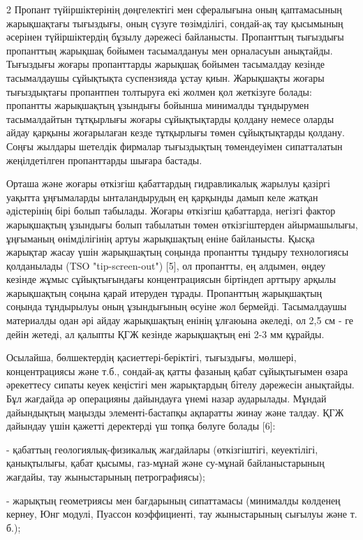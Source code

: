 \begin{multicols}{2}
Пропант түйіршіктерінің дөңгелектігі мен сфералығына оның қаптамасының
жарықшақтағы тығыздығы, оның сүзуге төзімділігі, сондай-ақ тау қысымының
әсерінен түйіршіктердің бұзылу дәрежесі байланысты. Пропанттың тығыздығы
пропанттың жарықшақ бойымен тасымалдануы мен орналасуын анықтайды.
Тығыздығы жоғары пропанттарды жарықшақ бойымен тасымалдау кезінде
тасымалдаушы сұйықтықта суспензияда ұстау қиын. Жарықшақты жоғары
тығыздықтағы пропантпен толтыруға екі жолмен қол жеткізуге болады:
пропантты жарықшақтың ұзындығы бойынша минималды тұндырумен
тасымалдайтын тұтқырлығы жоғары сұйықтықтарды қолдану немесе оларды
айдау қарқыны жоғарылаған кезде тұтқырлығы төмен сұйықтықтарды қолдану.
Соңғы жылдары шетелдік фирмалар тығыздықтың төмендеуімен сипатталатын
жеңілдетілген пропанттарды шығара бастады.

Орташа және жоғары өткізгіш қабаттардың гидравликалық жарылуы қазіргі
уақытта ұңғымаларды ынталандырудың ең қарқынды дамып келе жатқан
әдістерінің бірі болып табылады. Жоғары өткізгіш қабаттарда, негізгі
фактор жарықшақтың ұзындығы болып табылатын төмен өткізгіштерден
айырмашылығы, ұңғыманың өнімділігінің артуы жарықшақтың еніне
байланысты. Қысқа жарықтар жасау үшін жарықшақтың соңында пропантты
тұндыру технологиясы қолданылады (TSO "tip-screen-out") {[}5{]}, ол
пропантты, ең алдымен, өңдеу кезінде жұмыс сұйықтығындағы
концентрациясын біртіндеп арттыру арқылы жарықшақтың соңына қарай
итеруден тұрады. Пропанттың жарықшақтың соңында тұндырылуы оның
ұзындығының өсуіне жол бермейді. Тасымалдаушы материалды одан әрі айдау
жарықшақтың енінің ұлғаюына әкеледі, ол 2,5 см - ге дейін жетеді, ал
қалыпты ҚГЖ кезінде жарықшақтың ені 2-3 мм құрайды.

Осылайша, бөлшектердің қасиеттері-беріктігі, тығыздығы, мөлшері,
концентрациясы және т.б., сондай-ақ қатты фазаның қабат сұйықтығымен
өзара әрекеттесу сипаты кеуек кеңістігі мен жарықтардың бітелу дәрежесін
анықтайды. Бұл жағдайда әр операцияны дайындауға үнемі назар аударылады.
Мұндай дайындықтың маңызды элементі-бастапқы ақпаратты жинау және
талдау. ҚГЖ дайындау үшін қажетті деректерді үш топқа бөлуге болады
{[}6{]}:

- қабаттың геологиялық-физикалық жағдайлары (өткізгіштігі, кеуектілігі,
қанықтылығы, қабат қысымы, газ-мұнай және су-мұнай байланыстарының
жағдайы, тау жыныстарының петрографиясы);

- жарықтың геометриясы мен бағдарының сипаттамасы (минималды көлденең
кернеу, Юнг модулі, Пуассон коэффициенті, тау жыныстарының сығылуы және
т. б.);


\end{multicols}
